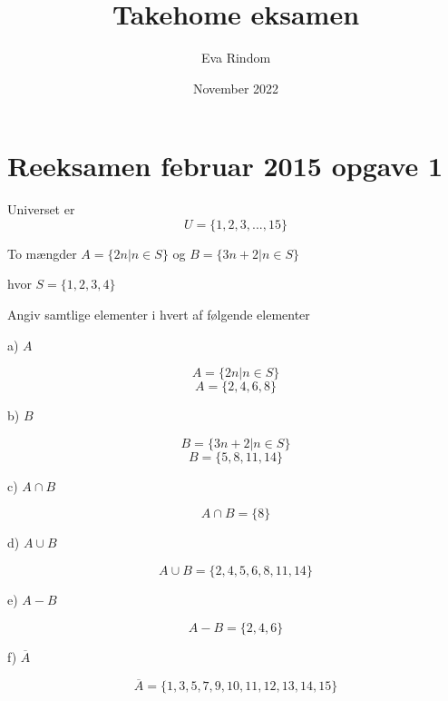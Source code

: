 \documentclass{article}
\title{Takehome eksamen}
\author{Eva Rindom}
\date{November 2022}
\begin{document}
\maketitle

\section{Reeksamen februar 2015 opgave 1}

Universet er
\[U=\{1,2,3,...,15\}\]

To mængder \(A=\{2n | n \in S\}\) og \(B=\{3n+2 | n \in S\}\)


hvor \(S=\{1,2,3,4\}\)

Angiv samtlige elementer i hvert af følgende elementer

a) \(A\) \par
\[A=\{2n | n \in S\}\]
\[A=\{2,4,6,8\}\]
\par
b) \(B\) \par
\[B=\{3n+2 | n \in S\}\]
\[B=\{5,8,11,14\}\]
\par
c) \(A \cap B\) \par
\[A \cap B=\{8\}\]\]
\par
d) \(A \cup B\) \par
\[A \cup B=\{2,4,5,6,8,11,14\}\]\]
\par
e) \(A - B\) \par
\[A - B=\{2,4,6\}\]\]
\par
f) \(\overline A\) \par
\[\overline A=\{1,3,5,7,9,10,11,12,13,14,15\}\]\]
\par
\end{document}
